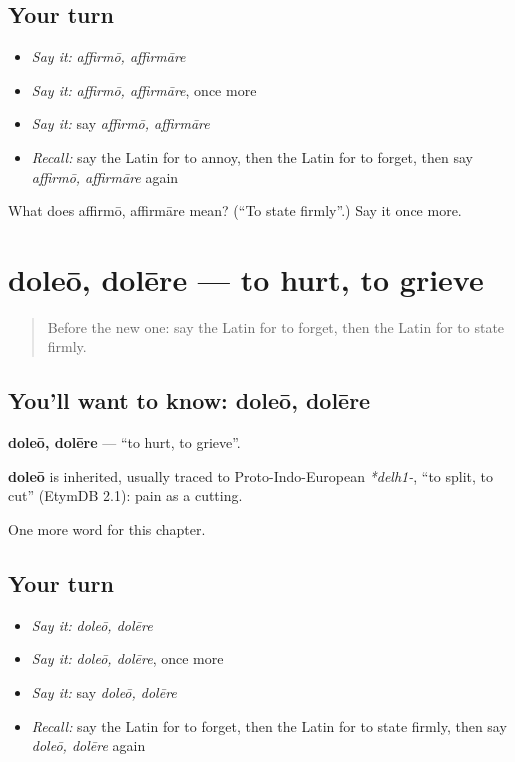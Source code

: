 \subsection*{Your turn}
\begin{itemize}
\raggedright
  \item \emph{Say it:} \emph{affirmō, affirmāre}
  \item \emph{Say it:} \emph{affirmō, affirmāre}, once more
  \item \emph{Say it:} say \emph{affirmō, affirmāre}
  \item \emph{Recall:} say the Latin for to annoy, then the Latin for to forget, then say \emph{affirmō, affirmāre} again
\end{itemize}

\begin{tcolorbox}[breakable,colback=teal!4,colframe=teal!35!black,title={Before you move on}]
What does affirmō, affirmāre mean? (\textquotedblleft{}To state firmly\textquotedblright{}.) Say it once more.
\end{tcolorbox}
\section[doleō, dolēre]{doleō, dolēre — to hurt, to grieve}

\label{lesson:LA-C204-doleo}



\begin{quote}
Before the new one: say the Latin for to forget, then the Latin for to state firmly.
\end{quote}

\subsection*{You'll want to know: doleō, dolēre}
\textbf{doleō, dolēre} — \textquotedblleft{}to hurt, to grieve\textquotedblright{}.

\begin{cousinweb}
\textbf{doleō} is inherited, usually traced to Proto-Indo-European \emph{*delh1-}, \textquotedblleft{}to split, to cut\textquotedblright{} (EtymDB 2.1): pain as a cutting.
\end{cousinweb}

\begin{grammarlens}[title={What you've built}]
One more word for this chapter.
\end{grammarlens}

\subsection*{Your turn}
\begin{itemize}
\raggedright
  \item \emph{Say it:} \emph{doleō, dolēre}
  \item \emph{Say it:} \emph{doleō, dolēre}, once more
  \item \emph{Say it:} say \emph{doleō, dolēre}
  \item \emph{Recall:} say the Latin for to forget, then the Latin for to state firmly, then say \emph{doleō, dolēre} again
\end{itemize}

